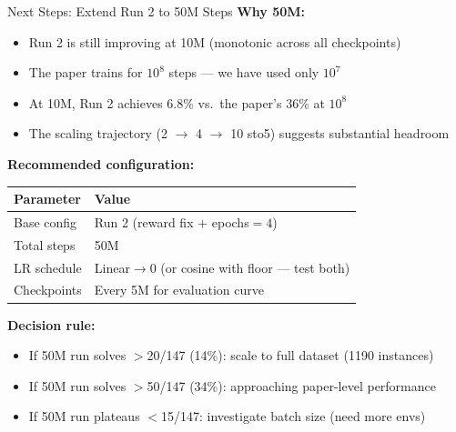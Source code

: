 \documentclass[aspectratio=169,11pt]{beamer}
\begin{document}
\begin{frame}{Next Steps: Extend Run 2 to 50M Steps}
  \small
  \textbf{Why 50M:}
  \begin{itemize}
    \item Run 2 is still improving at 10M (monotonic across all checkpoints)
    \item The paper trains for $10^8$ steps --- we have used only $10^7$
    \item At 10M, Run 2 achieves 6.8\% vs.\ the paper's 36\% at $10^8$
    \item The scaling trajectory (2 $\to$ 4 $\to$ 10 sto5) suggests substantial headroom
  \end{itemize}

  \medskip
  \textbf{Recommended configuration:}
  \begin{center}
  \footnotesize
  \begin{tabular}{ll}
    \toprule
    \textbf{Parameter} & \textbf{Value} \\
    \midrule
    Base config & Run 2 (reward fix + epochs${}=4$) \\
    Total steps & 50M \\
    LR schedule & Linear$\to$0 (or cosine with floor --- test both) \\
    Checkpoints & Every 5M for evaluation curve \\
    \bottomrule
  \end{tabular}
  \end{center}

  \medskip
  \textbf{Decision rule:}
  \begin{itemize}
    \item If 50M run solves $>$20/147 (14\%): scale to full dataset (1190 instances)
    \item If 50M run solves $>$50/147 (34\%): approaching paper-level performance
    \item If 50M run plateaus $<$15/147: investigate batch size (need more envs)
  \end{itemize}
\end{frame}

\appendix
\end{document}
